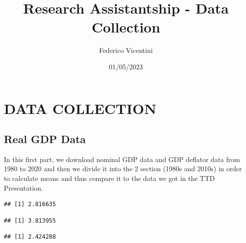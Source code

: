 \documentclass[
]{article}
\title{Research Assistantship - Data Collection}
\author{Federico Vicentini}
\date{01/05/2023}
\begin{document}
\maketitle

\hypertarget{data-collection}{%
\section{DATA COLLECTION}\label{data-collection}}

\hypertarget{real-gdp-data}{%
\subsection{Real GDP Data}\label{real-gdp-data}}

\par

In this first part, we download nominal GDP data and GDP deflator data
from 1980 to 2020 and then we divide it into the 2 section (1980s and
2010s) in order to calculate means and thus compare it to the data we
got in the TTD Presentation.

\begin{verbatim}
## [1] 2.816635
\end{verbatim}

\begin{verbatim}
## [1] 3.813955
\end{verbatim}

\begin{verbatim}
## [1] 2.424288
\end{verbatim}
\end{document}
